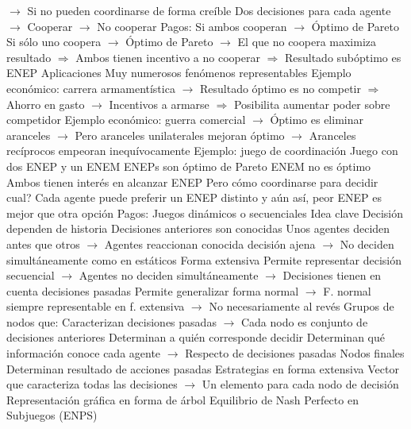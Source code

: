 \documentclass{nuevotema}
\begin{document}
\begin{esquemal}
				\4[] $\to$ Si no pueden coordinarse de forma creíble
				\4 Dos decisiones para cada agente
				\4[] $\to$ Cooperar
				\4[] $\to$ No cooperar
				\4 Pagos:
				\4[] 
				\4 Si ambos cooperan
				\4[] $\to$ Óptimo de Pareto
				\4 Si sólo uno coopera
				\4[] $\to$ Óptimo de Pareto
				\4[] $\to$ El que no coopera maximiza resultado
				\4[] $\Rightarrow$ Ambos tienen incentivo a no cooperar
				\4[] $\Rightarrow$ Resultado subóptimo es ENEP
				\4 Aplicaciones
				\4[] Muy numerosos fenómenos representables
				\4[] Ejemplo económico: carrera armamentística
				\4[] $\to$ Resultado óptimo es no competir
				\4[] $\Rightarrow$ Ahorro en gasto
				\4[] $\to$ Incentivos a armarse
				\4[] $\Rightarrow$ Posibilita aumentar poder sobre competidor
				\4[] Ejemplo económico: guerra comercial
				\4[] $\to$ Óptimo es eliminar aranceles
				\4[] $\to$ Pero aranceles unilaterales mejoran óptimo
				\4[] $\to$ Aranceles recíprocos empeoran inequívocamente
			\3 Ejemplo: juego de coordinación
				\4 Juego con dos ENEP y un ENEM
				\4 ENEPs son óptimo de Pareto
				\4 ENEM no es óptimo
				\4 Ambos tienen interés en alcanzar ENEP
				\4[] Pero cómo coordinarse para decidir cual?
				\4 Cada agente puede preferir un ENEP distinto
				\4[] y aún así, peor ENEP es mejor que otra opción
				\4 Pagos:
				\4[] 
		\2 Juegos dinámicos o secuenciales
			\3 Idea clave
				\4 Decisión dependen de historia
				\4[] Decisiones anteriores son conocidas
				\4 Unos agentes deciden antes que otros
				\4[] $\to$ Agentes reaccionan conocida decisión ajena
				\4[] $\to$ No deciden simultáneamente como en estáticos
			\3 Forma extensiva
				\4 Permite representar decisión secuencial
				\4[] $\to$ Agentes no deciden simultáneamente
				\4[] $\to$ Decisiones tienen en cuenta decisiones pasadas
				\4[] Permite generalizar forma normal
				\4[] $\to$ F. normal siempre representable en f. extensiva
				\4[] $\to$ No necesariamente al revés
				\4 Grupos de nodos que:
				\4[] Caracterizan decisiones pasadas
				\4[] $\to$ Cada nodo es conjunto de decisiones anteriores
				\4[] Determinan a quién corresponde decidir
				\4[] Determinan qué información conoce cada agente
				\4[] $\to$ Respecto de decisiones pasadas
				\4 Nodos finales
				\4[] Determinan resultado de acciones pasadas
				\4 Estrategias en forma extensiva
				\4[] Vector que caracteriza todas las decisiones
				\4[] $\to$ Un elemento para cada nodo de decisión
				\4 Representación gráfica en forma de árbol
				\4[] 
			\3 Equilibrio de Nash Perfecto en Subjuegos (ENPS)

\end{esquemal}
\end{document}

